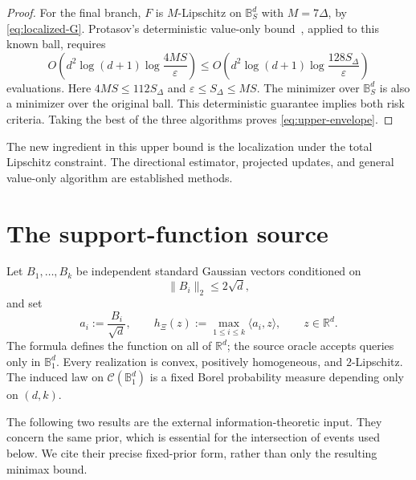 \documentclass[11pt]{article}
\newcommand{\R}{\mathbb{R}}
\newcommand{\B}{\mathbb{B}}
\newcommand{\eps}{\varepsilon}
\newcommand{\inner}[2]{\langle #1,#2\rangle}
\newcommand{\norm}[1]{\lVert #1\rVert_2}
\theoremstyle{plain}
\theoremstyle{definition}
\begin{document}
\begin{proof}
For the final branch, $F$ is $M$-Lipschitz on $\B_S^d$ with
$M=7\Delta$, by \eqref{eq:localized-G}. Protasov's deterministic
value-only bound~\cite{Protasov1996}, applied to this known ball,
requires
\[
 O\left(d^2\log(d+1)\log\!\frac{4MS}{\eps}\right)
 \le O\left(d^2\log(d+1)\log\!\frac{128S_\Delta}{\eps}\right)
\]
evaluations. Here $4MS\le112S_\Delta$ and
$\eps\le S_\Delta\le MS$. The minimizer over $\B_S^d$ is also
a minimizer over the original ball. This deterministic guarantee
implies both risk criteria. Taking the best of the three algorithms
proves \eqref{eq:upper-envelope}.
\end{proof}

The new ingredient in this upper bound is the localization under the
total Lipschitz constraint. The directional estimator, projected
updates, and general value-only algorithm are established methods.

\section{The support-function source}\label{sec:source}

Let $B_1,\ldots,B_k$ be independent standard Gaussian vectors conditioned on
\[
  \norm{B_i}\le2\sqrt d,
\]
and set
\[
  a_i:=\frac{B_i}{\sqrt d},
  \qquad
  h_\Xi(z):=\max_{1\le i\le k}\inner{a_i}{z},
  \qquad z\in\R^d.
\]
The formula defines the function on all of $\R^d$; the source oracle
accepts queries only in $\B_1^d$. Every realization is convex,
positively homogeneous, and $2$-Lipschitz. The induced law on
$\mathcal C(\B_1^d)$ is a fixed Borel probability measure depending
only on $(d,k)$.

The following two results are the external information-theoretic
input. They concern the same prior, which is essential for the
intersection of events used below. We cite their precise fixed-prior
form, rather than only the resulting minimax bound.
\end{document}
